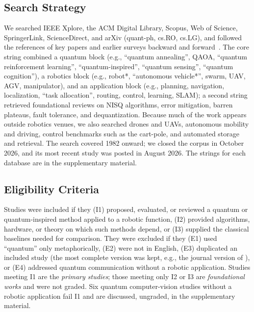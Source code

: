 \documentclass[acmsmall,screen,review]{acmart}
\begin{document}
\subsection{Search Strategy}\label{sec:search-strategy}
We searched IEEE Xplore, the ACM Digital Library, Scopus, Web of Science, SpringerLink, ScienceDirect, and arXiv (quant-ph, cs.RO, cs.LG), and followed the references of key papers and earlier surveys backward and forward~\cite{Petschnigg2019,Yan2024,Tandon2017,Meyer2022}. The core string combined a quantum block (e.g., ``quantum annealing'', QAOA, ``quantum reinforcement learning'', ``quantum-inspired'', ``quantum sensing'', ``quantum cognition''), a robotics block (e.g., robot*, ``autonomous vehicle*'', swarm, UAV, AGV, manipulator), and an application block (e.g., planning, navigation, localization, ``task allocation'', routing, control, learning, SLAM); a second string retrieved foundational reviews on NISQ algorithms, error mitigation, barren plateaus, fault tolerance, and dequantization. Because much of the work appears outside robotics venues, we also searched drones and UAVs, autonomous mobility and driving, control benchmarks such as the cart-pole, and automated storage and retrieval. The search covered 1982 onward; we closed the corpus in October 2026, and its most recent study was posted in August 2026. The strings for each database are in the supplementary material.

\subsection{Eligibility Criteria}\label{sec:criteria}
Studies were included if they (I1) proposed, evaluated, or reviewed a quantum or quantum-inspired method applied to a robotic function, (I2) provided algorithms, hardware, or theory on which such methods depend, or (I3) supplied the classical baselines needed for comparison. They were excluded if they (E1) used ``quantum'' only metaphorically, (E2) were not in English, (E3) duplicated an included study (the most complete version was kept, e.g., the journal version of \citet{Hohenfeld2024}), or (E4) addressed quantum communication without a robotic application. Studies meeting I1 are the \emph{primary studies}; those meeting only I2 or I3 are \emph{foundational works} and were not graded. Six quantum computer-vision studies without a robotic application fail I1 and are discussed, ungraded, in the supplementary material.
\end{document}
